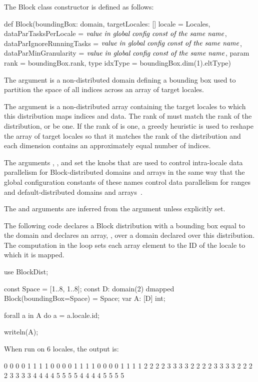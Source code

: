 The Block class constructor is defined as follows:
\begin{chapel}
def Block(boundingBox: domain,
          targetLocales: [] locale = Locales, 
          dataParTasksPerLocale = $\mbox{{\it value in global config const of the same name}}$,
          dataParIgnoreRunningTasks = $\mbox{{\it value in global config const of the same name}}$,
          dataParMinGranularity = $\mbox{{\it value in global config const of the same name}}$,
          param rank = boundingBox.rank,
          type idxType = boundingBox.dim(1).eltType)
\end{chapel}

The argument  is a non-distributed domain defining a
bounding box used to partition the space of all indices across an
array of target locales.

The argument  is a non-distributed array
containing the target locales to which this distribution maps indices
and data.  The rank of  must match the rank of the
distribution, or be one.  If the rank of
 is one, a greedy heuristic is used to reshape the
array of target locales so that it matches the rank of the
distribution and each dimension contains an approximately equal number
of indices.

The
arguments , ,
and  set the knobs that are used to
control intra-locale data parallelism for Block-distributed domains
and arrays in the same way that the global configuration constants of
these names control data parallelism for ranges and
default-distributed domains and arrays~.

The  and  arguments are inferred from the
 argument unless explicitly set.

\begin{example}
The following code declares a Block distribution with a bounding box
equal to the domain  and declares an array, , over
a domain declared over this distribution.  The computation in
the  loop sets each array element to the ID of the locale
to which it is mapped.
\begin{chapel}
use BlockDist;

const Space = [1..8, 1..8];
const D: domain(2) dmapped Block(boundingBox=Space) = Space;
var A: [D] int;

forall a in A do
  a = a.locale.id;

writeln(A);
\end{chapel}
When run on 6 locales, the output is:
\begin{chapel}
0 0 0 0 1 1 1 1
0 0 0 0 1 1 1 1
0 0 0 0 1 1 1 1
2 2 2 2 3 3 3 3
2 2 2 2 3 3 3 3
2 2 2 2 3 3 3 3
4 4 4 4 5 5 5 5
4 4 4 4 5 5 5 5
\end{chapel}
\end{example}

